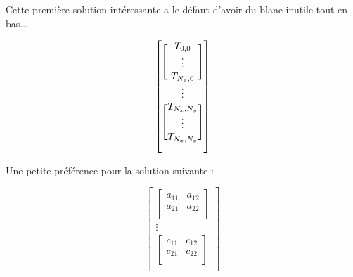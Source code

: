 \documentclass {article}
\begin{document}
Cette première solution intéressante a le défaut d'avoir du blanc inutile tout en bas...

\begin{equation}
	\left[\begin{blockarray}{[cc]}
		T_{0,0} \\
		\vdots \\
		T_{N_x,0} \\
		\begin{block}{cc}
			\vdots\\
		\end{block}
		T_{N_x,N_y} \\
		\vdots \\
		T_{N_x,N_y}\\
	\end{blockarray}\right]
\end{equation}


Une petite préférence pour la solution suivante :

\[
	\left[
		\begin{array}{c}
			\left[
				\begin{array}{cc}
					a_{11} & a_{12} \\
					a_{21} & a_{22} \\
				\end{array}
			\right]  \\
			\mathbf{\vdots} \\
			\left[
				\begin{array}{cc}
					c_{11} & c_{12} \\
					c_{21} & c_{22} \\
				\end{array}
			\right] \\
		\end{array}
	\right]
\]
\end{document}
